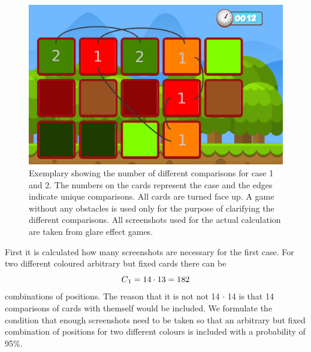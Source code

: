 \begin{figure}[H]
	\centering
	\includegraphics[width=14cm]{images/noObstTurnedNotes.png}
	\caption[Exemplary showing the number of different comparisons of two colours.]{Exemplary showing the number of different comparisons for case 1 and 2. The numbers on the cards represent the case and the edges indicate unique comparisons. All cards are turned face up. A game without any obstacles is used only for the purpose of clarifying the different comparisons. All screenshots used for the actual calculation are taken from glare effect games.}
	\label{fig:noObstTurnedNotes}
\end{figure}

First it is calculated how many screenshots are necessary for the first case. For two different coloured arbitrary but fixed cards there can be 
\begin{equation*}
C\textsubscript{1} = 14 \cdot 13 = 182 
\end{equation*}
combinations of positions. The reason that it is not not 14 $\cdot$ 14 is that 14 comparisons of cards with themself would be included. We formulate the condition that enough screenshots need to be taken so that an arbitrary but fixed combination of positions for two different colours is included with a probability of 95\%. 

